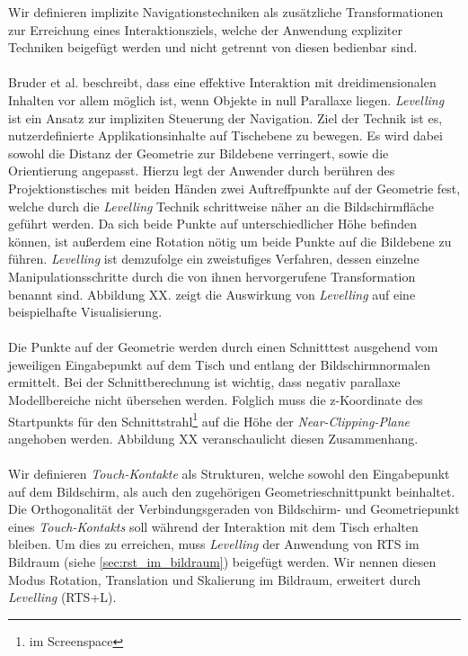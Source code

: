 Wir definieren implizite Navigationstechniken als zusätzliche Transformationen zur Erreichung eines Interaktionsziels, welche der Anwendung expliziter Techniken beigefügt werden und nicht getrennt von diesen bedienbar sind. 
\\\\
Bruder et al. \cite{bruder:2013} beschreibt, dass eine effektive Interaktion mit dreidimensionalen Inhalten vor allem möglich ist, wenn Objekte in null Parallaxe liegen. \emph{Levelling} ist ein Ansatz zur impliziten Steuerung der Navigation. Ziel der Technik ist es, nutzerdefinierte Applikationsinhalte auf Tischebene zu bewegen. Es wird dabei sowohl die Distanz der Geometrie zur Bildebene verringert, sowie die Orientierung angepasst. Hierzu legt der Anwender durch berühren des Projektionstisches mit beiden Händen zwei Auftreffpunkte auf der Geometrie fest, welche durch die \emph{Levelling} Technik schrittweise näher an die Bildschirmfläche geführt werden. Da sich beide Punkte auf unterschiedlicher Höhe befinden können, ist außerdem eine Rotation nötig um beide Punkte auf die Bildebene zu führen. \emph{Levelling} ist demzufolge ein zweistufiges Verfahren, dessen einzelne Manipulationsschritte durch die von ihnen hervorgerufene Transformation benannt sind. Abbildung XX. zeigt die Auswirkung von \emph{Levelling} auf eine beispielhafte Visualisierung.
\\\\
Die Punkte auf der Geometrie werden durch einen Schnitttest ausgehend vom jeweiligen Eingabepunkt auf dem Tisch und entlang der Bildschirmnormalen ermittelt. Bei der Schnittberechnung ist wichtig, dass negativ parallaxe Modellbereiche nicht übersehen werden. Folglich muss die z-Koordinate des Startpunkts für den Schnittstrahl\footnote{im Screenspace} auf die Höhe der \emph{Near-Clipping-Plane} angehoben werden. Abbildung XX veranschaulicht diesen Zusammenhang.
\\\\
Wir definieren \emph{Touch-Kontakte} als Strukturen, welche sowohl den Eingabepunkt auf dem Bildschirm, als auch den zugehörigen Geometrieschnittpunkt beinhaltet. Die Orthogonalität der Verbindungsgeraden von Bildschirm- und Geometriepunkt eines \emph{Touch-Kontakts} soll während der Interaktion mit dem Tisch erhalten bleiben. Um dies zu erreichen, muss \emph{Levelling} der Anwendung von RTS im Bildraum (siehe \ref{sec:rst_im_bildraum}) beigefügt werden. Wir nennen diesen Modus Rotation, Translation und Skalierung im Bildraum, erweitert durch \emph{Levelling} (RTS+L).


